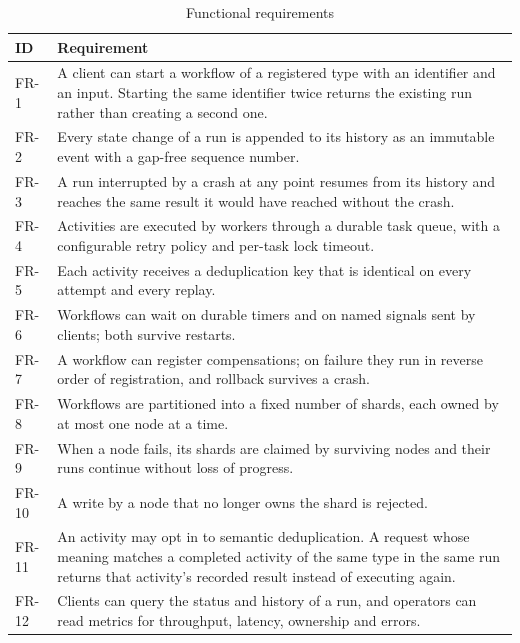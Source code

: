 \begin{table}[htbp]
  \centering
  \caption{Functional requirements}
  \label{tab:fr}
  \small
  \begin{tabular}{|p{0.49in}|p{4.88in}|}
    \hline
    \textbf{ID} & \textbf{Requirement} \\
    \hline
    FR-1 & A client can start a workflow of a registered type with an
      identifier and an input. Starting the same identifier twice returns the
      existing run rather than creating a second one. \\
    \hline
    FR-2 & Every state change of a run is appended to its history as an
      immutable event with a gap-free sequence number. \\
    \hline
    FR-3 & A run interrupted by a crash at any point resumes from its history
      and reaches the same result it would have reached without the crash. \\
    \hline
    FR-4 & Activities are executed by workers through a durable task queue,
      with a configurable retry policy and per-task lock timeout. \\
    \hline
    FR-5 & Each activity receives a deduplication key that is identical on
      every attempt and every replay. \\
    \hline
    FR-6 & Workflows can wait on durable timers and on named signals sent by
      clients; both survive restarts. \\
    \hline
    FR-7 & A workflow can register compensations; on failure they run in
      reverse order of registration, and rollback survives a crash. \\
    \hline
    FR-8 & Workflows are partitioned into a fixed number of shards, each owned
      by at most one node at a time. \\
    \hline
    FR-9 & When a node fails, its shards are claimed by surviving nodes and
      their runs continue without loss of progress. \\
    \hline
    FR-10 & A write by a node that no longer owns the shard is rejected. \\
    \hline
    FR-11 & An activity may opt in to semantic deduplication. A request whose
      meaning matches a completed activity of the same type in the same run
      returns that activity's recorded result instead of executing again. \\
    \hline
    FR-12 & Clients can query the status and history of a run, and operators
      can read metrics for throughput, latency, ownership and errors. \\
    \hline
  \end{tabular}
\end{table}

